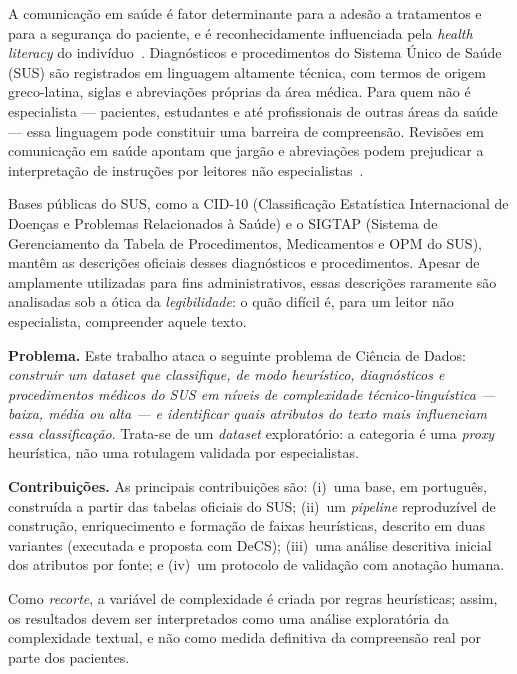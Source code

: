 \documentclass[12pt]{article}
\begin{document}
A comunicação em saúde é fator determinante para a adesão a tratamentos e para
a segurança do paciente, e é reconhecidamente influenciada pela
\textit{health literacy} do indivíduo~\cite{nutbeam2008,sorensen2012}.
Diagnósticos e procedimentos do Sistema Único de Saúde (SUS) são registrados
em linguagem altamente técnica, com termos de origem greco-latina, siglas e
abreviações próprias da área médica. Para quem não é especialista ---
pacientes, estudantes e até profissionais de outras áreas da saúde ---
essa linguagem pode constituir uma barreira de compreensão. Revisões em
comunicação em saúde apontam que jargão e abreviações podem prejudicar a
interpretação de instruções por leitores não especialistas~\cite{maghroudi2021}.

Bases públicas do SUS, como a CID-10 (Classificação Estatística Internacional
de Doenças e Problemas Relacionados à Saúde) e o SIGTAP (Sistema de
Gerenciamento da Tabela de Procedimentos, Medicamentos e OPM do SUS), mantêm
as descrições oficiais desses diagnósticos e procedimentos. Apesar de amplamente utilizadas para fins
administrativos, essas descrições raramente são analisadas sob a ótica da
\textit{legibilidade}: o quão difícil é, para um leitor não especialista,
compreender aquele texto.

\textbf{Problema.} Este trabalho ataca o seguinte problema de Ciência de
Dados: \textit{construir um dataset que classifique, de modo heurístico,
diagnósticos e procedimentos médicos do SUS em níveis de complexidade
técnico-linguística --- baixa, média ou alta --- e identificar quais
atributos do texto mais influenciam essa classificação}. Trata-se de um
\textit{dataset} exploratório: a categoria é uma \textit{proxy} heurística,
não uma rotulagem validada por especialistas.

\textbf{Contribuições.} As principais contribuições são:
(i)~uma base, em português, construída a partir das tabelas oficiais do SUS;
(ii)~um \textit{pipeline} reproduzível de construção, enriquecimento e
formação de faixas heurísticas, descrito em duas variantes (executada e
proposta com DeCS); (iii)~uma análise descritiva inicial dos atributos por
fonte; e (iv)~um protocolo de validação com anotação humana.

Como \textit{recorte}, a variável de complexidade é criada por regras
heurísticas; assim, os resultados devem ser interpretados como uma análise
exploratória da complexidade textual, e não como medida definitiva da
compreensão real por parte dos pacientes.
\end{document}
